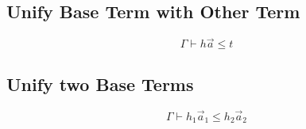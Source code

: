\subsection{Unify Base Term with Other Term}


$$
    \Gamma \vdash h \vec a \le t
$$




\subsection{Unify two Base Terms}


$$
    \Gamma \vdash h_1 \vec a_1 \le h_2 \vec a_2
$$
